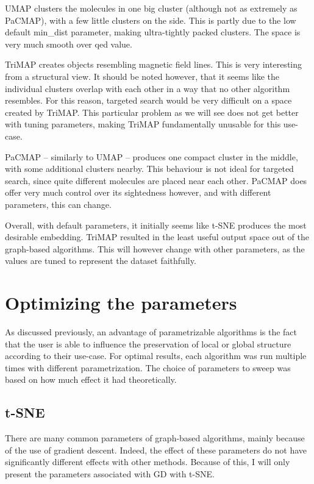 UMAP clusters the molecules in one big cluster (although not as extremely as PaCMAP), with a few little clusters on the side. This is partly due to the low default min\_dist parameter, making ultra-tightly packed clusters. The space is very much smooth over qed value. 

TriMAP creates objects resembling magnetic field lines. This is very interesting from a structural view. It should be noted however, that it seems like the individual clusters overlap with each other in a way that no other algorithm resembles. For this reason, targeted search would be very difficult on a space created by TriMAP. This particular problem as we will see does not get better with tuning parameters, making TriMAP fundamentally unusable for this use-case.

PaCMAP -- similarly to UMAP -- produces one compact cluster in the middle, with some additional clusters nearby. This behaviour is not ideal for targeted search, since quite different molecules are placed near each other. PaCMAP does offer very much control over its sightedness however, and with different parameters, this can change.

Overall, with default parameters, it initially seems like t-SNE produces the most desirable embedding. TriMAP resulted in the least useful output space out of the graph-based algorithms. This will however change with other parameters, as the values are tuned to represent the dataset faithfully.

\section{Optimizing the parameters}\label{sec:optimizing-the-parameters}

As discussed previously, an advantage of parametrizable algorithms is the fact that the user is able to influence the preservation of local or global structure according to their use-case. For optimal results, each algorithm was run multiple times with different parametrization. The choice of parameters to sweep was based on how much effect it had theoretically. 

\subsection{t-SNE}

There are many common parameters of graph-based algorithms, mainly because of the use of gradient descent. Indeed, the effect of these parameters do not have significantly different effects with other methods. Because of this, I will only present the parameters associated with GD with t-SNE.

